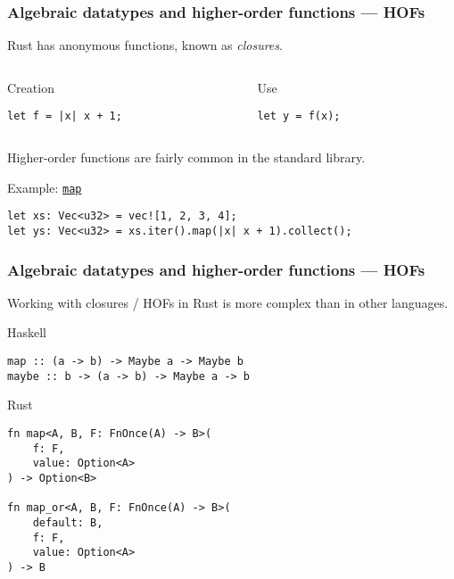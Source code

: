 \documentclass[t]{beamer}
\begin{document}
\begin{frame}[fragile]
\frametitle{Algebraic datatypes and higher-order functions --- HOFs}

Rust has anonymous functions, known as \emph{closures}.

\begin{columns}

\begin{column}[T]{0.48\textwidth}
\begin{block}{Creation}
\small
\begin{verbatim}
let f = |x| x + 1;
\end{verbatim}
\end{block}
\end{column}

\begin{column}[T]{0.48\textwidth}
\begin{block}{Use}
\small
\begin{verbatim}
let y = f(x);
\end{verbatim}
\end{block}
\end{column}

\end{columns}

\bigskip

Higher-order functions are fairly common in the standard library.

\begin{block}{Example: \href{https://doc.rust-lang.org/std/iter/struct.Map.html}{\texttt{map}}}
\begin{verbatim}
let xs: Vec<u32> = vec![1, 2, 3, 4];
let ys: Vec<u32> = xs.iter().map(|x| x + 1).collect();
\end{verbatim}
\end{block}

\end{frame}


\begin{frame}[fragile]
\frametitle{Algebraic datatypes and higher-order functions --- HOFs}

Working with closures / HOFs in Rust is more complex than in other languages.

\begin{block}{Haskell}
\begin{verbatim}
map :: (a -> b) -> Maybe a -> Maybe b
maybe :: b -> (a -> b) -> Maybe a -> b
\end{verbatim}
\end{block}

\begin{block}{Rust}
\small
\begin{verbatim}
fn map<A, B, F: FnOnce(A) -> B>(
    f: F,
    value: Option<A>
) -> Option<B>

fn map_or<A, B, F: FnOnce(A) -> B>(
    default: B,
    f: F,
    value: Option<A>
) -> B
\end{verbatim}
\end{block}

\end{frame}
\end{document}

